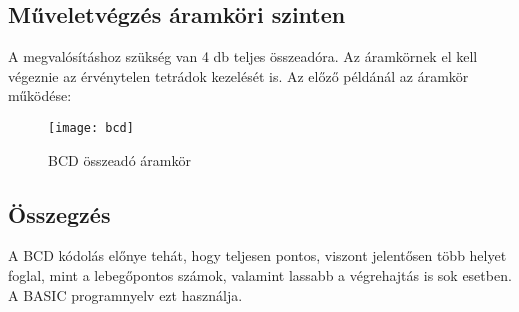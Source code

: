 \subsection{Műveletvégzés áramköri szinten}
A megvalósításhoz szükség van 4 db teljes összeadóra.
Az áramkörnek el kell végeznie az érvénytelen tetrádok kezelését is.
Az előző példánál az áramkör működése:
\begin{figure}[H]
    \texttt{[image: bcd]}
    \centering
    \caption{BCD összeadó áramkör}
    \label{fig:bcd}
\end{figure}

\subsection{Összegzés}
A BCD kódolás előnye tehát, hogy teljesen pontos, viszont jelentősen több helyet foglal, mint a lebegőpontos számok, valamint lassabb a végrehajtás is sok esetben.
A BASIC programnyelv ezt használja.